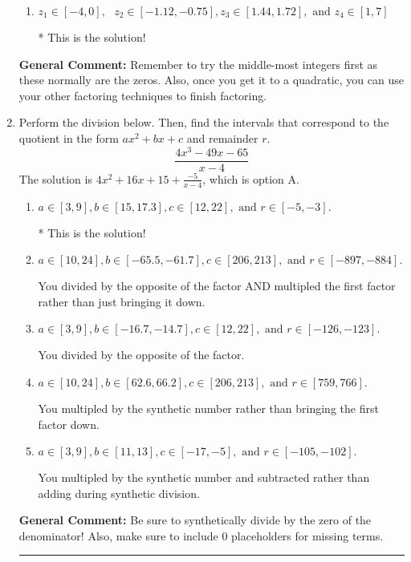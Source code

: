 \documentclass{extbook}[14pt]
\newcommand{\litem}[1]{\item #1

\rule{\textwidth}{0.4pt}}
\begin{document}
\begin{enumerate}
{\begin{enumerate}[label=\Alph*.]
 Distractor 1: Corresponds to negatives of all zeros.
\item \( z_1 \in [-4, 0], \text{   }  z_2 \in [-1.12, -0.75], z_3 \in [1.44, 1.72], \text{   and   } z_4 \in [1, 7] \)

* This is the solution!
\end{enumerate}

\textbf{General Comment:} Remember to try the middle-most integers first as these normally are the zeros. Also, once you get it to a quadratic, you can use your other factoring techniques to finish factoring.
}
\litem{
Perform the division below. Then, find the intervals that correspond to the quotient in the form $ax^2+bx+c$ and remainder $r$.
\[ \frac{4x^{3} -49 x -65}{x -4} \]The solution is \( 4x^{2} +16 x + 15 + \frac{-5}{x -4} \), which is option A.\begin{enumerate}[label=\Alph*.]
\item \( a \in [3, 9], b \in [15, 17.3], c \in [12, 22], \text{ and } r \in [-5, -3]. \)

* This is the solution!
\item \( a \in [10, 24], b \in [-65.5, -61.7], c \in [206, 213], \text{ and } r \in [-897, -884]. \)

 You divided by the opposite of the factor AND multipled the first factor rather than just bringing it down.
\item \( a \in [3, 9], b \in [-16.7, -14.7], c \in [12, 22], \text{ and } r \in [-126, -123]. \)

 You divided by the opposite of the factor.
\item \( a \in [10, 24], b \in [62.6, 66.2], c \in [206, 213], \text{ and } r \in [759, 766]. \)

 You multipled by the synthetic number rather than bringing the first factor down.
\item \( a \in [3, 9], b \in [11, 13], c \in [-17, -5], \text{ and } r \in [-105, -102]. \)

 You multipled by the synthetic number and subtracted rather than adding during synthetic division.
\end{enumerate}

\textbf{General Comment:} Be sure to synthetically divide by the zero of the denominator! Also, make sure to include 0 placeholders for missing terms.
}
\end{enumerate}
\end{document}
